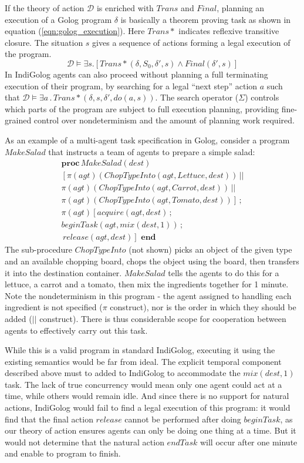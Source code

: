 If the theory of action $\mathcal{D}$ is enriched with $Trans$ and
$Final$, planning an execution of a Golog program $\delta$ is basically
a theorem proving task as shown in equation (\ref{eqn:golog_execution}).
Here $Trans*$ indicates reflexive transitive closure. The situation
$s$ gives a sequence of actions forming a legal execution of the
program.\begin{equation}
\mathcal{D}\models\exists s.\left[Trans*(\delta,S_{0},\delta',s)\wedge Final(\delta',s)\right]\label{eqn:golog_execution}\end{equation}
 In IndiGolog agents can also proceed without planning a full terminating
execution of their program, by searching for a legal {}``next step''
action $a$ such that $\mathcal{D}\models\exists a\,.\, Trans*(\delta,s,\delta',do(a,s))$.
The search operator ($\Sigma$) controls which parts of the program
are subject to full execution planning, providing fine-grained control
over nondeterminism and the amount of planning work required.

As an example of a multi-agent task specification in Golog, consider
a program $MakeSalad$ that instructs a team of agents to prepare
a simple salad:\begin{multline}
\mathbf{proc}\, MakeSalad(dest)\\
\left[\pi(agt)(ChopTypeInto(agt,Lettuce,dest))\,||\right.\\
\pi(agt)(ChopTypeInto(agt,Carrot,dest))\,||\\
\left.\pi(agt)(ChopTypeInto(agt,Tomato,dest))\right]\,;\\
\pi(agt)\left[acquire(agt,dest)\,;\,\right.\\
beginTask(agt,mix(dest,1))\,;\\
\left.\, release(agt,dest)\right]\,\,\mathbf{end}\label{eqn:MakeSalad}\end{multline}
 The sub-procedure $ChopTypeInto$ (not shown) picks an object of
the given type and an available chopping board, chops the object using
the board, then transfers it into the destination container. $MakeSalad$
tells the agents to do this for a lettuce, a carrot and a tomato,
then mix the ingredients together for 1 minute. Note the nondeterminism
in this program - the agent assigned to handling each ingredient is
not specified ($\pi$ construct), nor is the order in which they should
be added ($||$ construct). There is thus considerable scope for cooperation
between agents to effectively carry out this task.

While this is a valid program in standard IndiGolog, executing it
using the existing semantics would be far from ideal. The explicit
temporal component described above must to added to IndiGolog to accommodate
the $mix(dest,1)$ task. The lack of true concurrency would mean only
one agent could act at a time, while others would remain idle. And
since there is no support for natural actions, IndiGolog would fail
to find a legal execution of this program: it would find that the
final action $release$ cannot be performed after doing $beginTask$,
as our theory of action ensures agents can only be doing one thing
at a time. But it would not determine that the natural action $endTask$
will occur after one minute and enable to program to finish.


